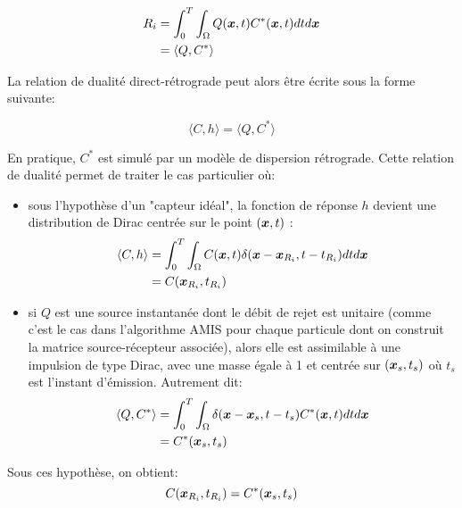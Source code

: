 {\begin{equation}
\begin{split}
R_i &= \int_0^T \int_{\Omega} Q({\bm{x}},t)C^*({\bm{x}}, t)dtd{\bm{x}} \\
&= \langle Q, C^* \rangle
\end{split}
\end{equation}

La relation de dualité direct-rétrograde peut alors être écrite sous la forme suivante: 

\begin{equation}
\langle C,h \rangle = \langle Q, C^* \rangle
\end{equation}

En pratique, $C^*$ est simulé par un modèle de dispersion rétrograde. Cette relation de dualité permet de traiter le cas particulier où:
\begin{itemize}
	\item sous l'hypothèse d'un "capteur idéal", la fonction de réponse $h$ devient une distribution de Dirac centrée sur le point $({\bm{x}}, t)$ : 
	\begin{equation}
	\begin{split}
		\langle C,h \rangle &= \int_0^T \int_{\Omega} C({\bm{x}},t)\delta({\bm{x}} - {\bm{x}}_{R_i}, t - t_{R_i})dtd{\bm{x}} \\
		& = C({\bm{x}}_{R_i}, t_{R_i})
		\end{split}
	\end{equation}
	\item si $Q$ est une source instantanée dont le débit de rejet est unitaire (comme c'est le cas dans l'algorithme AMIS pour chaque particule dont on construit la matrice source-récepteur associée), alors elle est assimilable à une impulsion de type Dirac, avec une masse égale à 1 et centrée sur $({\bm{x}_s}, t_s)$ où $t_s$ est l'instant d'émission. Autrement dit:
	\begin{equation}
	\begin{split}
		\langle Q, C^* \rangle &= \int_0^T \int_{\Omega} \delta({\bm{x}} - {\bm{x}_s}, t-t_s)C^*({\bm{x}}, t) dt d{\bm{x}} \\
		&= C^*({\bm{x}_s}, t_s)
		\end{split}
	\end{equation}
\end{itemize}

Sous ces hypothèse, on obtient:
\begin{equation}
C({\bm{x}}_{R_i}, t_{R_i}) = C^* ({\bm{x}_s}, t_s)
\end{equation}




}
